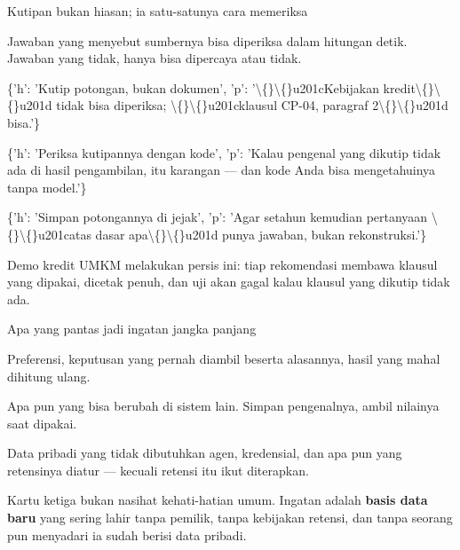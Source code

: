 \documentclass[aspectratio=169,11pt,t]{beamer}
\begin{document}
\begin{frame}[shrink=25]{Kutipan bukan hiasan; ia satu-satunya cara memeriksa}
{\fontsize{9.4}{12.6}\selectfont\color{fg2}Jawaban yang menyebut sumbernya bisa diperiksa dalam hitungan detik. Jawaban yang tidak, hanya bisa dipercaya atau tidak.\par}\vskip 4pt
\begin{isteps}
\item \{'h': 'Kutip potongan, bukan dokumen', 'p': '\textbackslash\{\}\textbackslash\{\}u201cKebijakan kredit\textbackslash\{\}\textbackslash\{\}u201d tidak bisa diperiksa; \textbackslash\{\}\textbackslash\{\}u201cklausul CP-04, paragraf 2\textbackslash\{\}\textbackslash\{\}u201d bisa.'\}
\item \{'h': 'Periksa kutipannya dengan kode', 'p': 'Kalau pengenal yang dikutip tidak ada di hasil pengambilan, itu karangan --- dan kode Anda bisa mengetahuinya tanpa model.'\}
\item \{'h': 'Simpan potongannya di jejak', 'p': 'Agar setahun kemudian pertanyaan \textbackslash\{\}\textbackslash\{\}u201catas dasar apa\textbackslash\{\}\textbackslash\{\}u201d punya jawaban, bukan rekonstruksi.'\}
\end{isteps}
\begin{iband}[signal]
Demo kredit UMKM melakukan persis ini: tiap rekomendasi membawa klausul yang dipakai, dicetak penuh, dan uji akan gagal kalau klausul yang dikutip tidak ada.
\end{iband}
\end{frame}

\begin{frame}[shrink=25]{Apa yang pantas jadi ingatan jangka panjang}
\begin{minipage}[t]{0.3253\textwidth}
\begin{icardgood}
Preferensi, keputusan yang pernah diambil beserta alasannya, hasil yang mahal dihitung ulang.
\end{icardgood}
\end{minipage}%
\hfill
\begin{minipage}[t]{0.3253\textwidth}
\begin{icard}
Apa pun yang bisa berubah di sistem lain. Simpan pengenalnya, ambil nilainya saat dipakai.
\end{icard}
\end{minipage}%
\hfill
\begin{minipage}[t]{0.3253\textwidth}
\begin{icardbad}
Data pribadi yang tidak dibutuhkan agen, kredensial, dan apa pun yang retensinya diatur --- kecuali retensi itu ikut diterapkan.
\end{icardbad}
\end{minipage}%
{\fontsize{9.4}{12.6}\selectfont\color{fg2}Kartu ketiga bukan nasihat kehati-hatian umum. Ingatan adalah \textbf{basis data baru} yang sering lahir tanpa pemilik, tanpa kebijakan retensi, dan tanpa seorang pun menyadari ia sudah berisi data pribadi.\par}\vskip 4pt
\end{frame}
\end{document}
